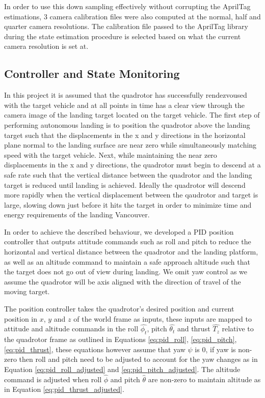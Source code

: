 \documentclass[11pt, twocolumn]{article}
\begin{document}
In order to use this down sampling effectively without corrupting the AprilTag estimations, 3 camera calibration files were also computed at the normal, half and quarter camera resolutions. The calibration file passed to the AprilTag library during the state estimation procedure is selected based on what the current camera resolution is set at. 

\subsection{Controller and State Monitoring}
In this project it is assumed that the quadrotor has successfully rendezvoused with the target vehicle and at all points in time has a clear view through the camera image of the landing target located on the target vehicle. The first step of performing  autonomous landing is to position the quadrotor above the landing target such that the displacements in the x and y directions in the horizontal plane normal to the landing surface are near zero while simultaneously matching speed with the target vehicle. Next, while maintaining the near zero displacements in the x and y directions, the quadrotor must begin to descend at a safe rate such that the vertical distance between the quadrotor and the landing target is reduced until landing is achieved. Ideally the quadrotor will descend more rapidly when the vertical displacement between the qaudrotor and target is large, slowing down just before it hits the target in order to minimize time and energy requirements of the landing Vancouver. 

In order to achieve the described behaviour, we developed a PID position controller that outputs attitude commands such as roll and pitch to reduce the horizontal and vertical distance between the quadrotor and the landing platform, as well as an altitude command to maintain a safe approach altitude such that the target does not go out of view during landing. We omit yaw control as we assume the quadrotor will be axis aligned with the direction of travel of the moving target. 

The position controller takes the quadrotor's desired position and current position in $x$, $y$ and $z$ of the world frame as inputs, these inputs are mapped to attitude and altitude commands in the roll $\hat{\phi_t}$, pitch $\hat{\theta_t}$ and thrust $\hat{T_z}$ relative to the quadrotor frame as outlined in Equations \ref{eq:pid_roll}, \ref{eq:pid_pitch}, \ref{eq:pid_thrust}, these equations however assume that yaw $\psi$ is 0, if yaw is non-zero then roll and pitch need to be adjusted to account for the yaw changes as in Equation \ref{eq:pid_roll_adjusted} and \ref{eq:pid_pitch_adjusted}. The altitude command is adjusted when roll $\hat{\phi}$ and pitch $\hat{\theta}$ are non-zero to maintain altitude as in Equation \ref{eq:pid_thrust_adjusted}. 
\end{document}
